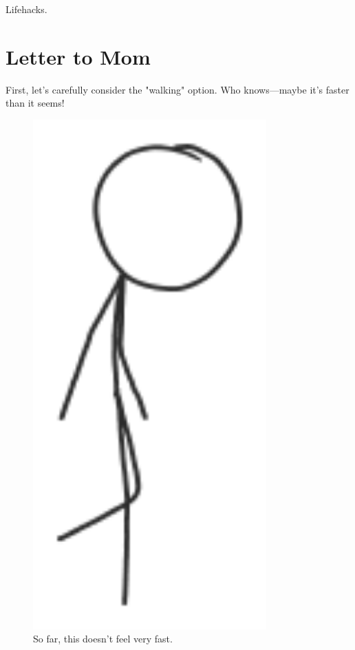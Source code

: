 {{Lifehacks.}

{
\chapter{Letter to Mom}
}

\hfill{}

{First, let's carefully consider the "walking" option. Who knows—maybe it's faster than it seems!}

\begin{figure}[!htbp]
\centering
\includegraphics[scale=0.5, max width=0.8\textwidth]{imgs/a/107/walk.png}
\caption{So far, this doesn't feel very fast.}
\end{figure}

}
